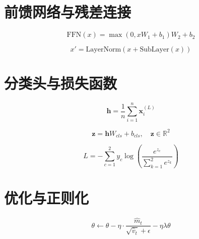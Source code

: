 \documentclass[12pt, a4paper]{article}
\begin{document}
\section{前馈网络与残差连接}
\begin{equation}
    \text{FFN}(x) = \max(0, xW_1 + b_1)W_2 + b_2
\end{equation}

\begin{equation}
    x' = \text{LayerNorm}(x + \text{SubLayer}(x))
\end{equation}

\section{分类头与损失函数}
\begin{equation}
    \mathbf{h} = \frac{1}{n}\sum_{i=1}^{n} \mathbf{x}_i^{(L)}
\end{equation}

\begin{equation}
    \mathbf{z} = \mathbf{h}W_{cls} + b_{cls}, \quad \mathbf{z} \in \mathbb{R}^2
\end{equation}

\begin{equation}
    L = -\sum_{c=1}^{2} y_c \log\left(\frac{e^{z_c}}{\sum_{k=1}^{2} e^{z_k}}\right)
\end{equation}

\section{优化与正则化}
\begin{equation}
    \theta \leftarrow \theta - \eta \cdot \frac{\hat{m}_t}{\sqrt{\hat{v}_t} + \epsilon} - \eta \lambda \theta
\end{equation}
\end{document}
